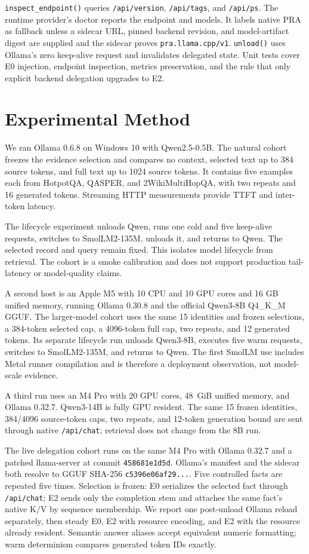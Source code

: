\documentclass[10pt]{article}
\begin{document}
\texttt{inspect\_endpoint()} queries \texttt{/api/version}, \texttt{/api/tags},
and \texttt{/api/ps}. The runtime provider's doctor reports the endpoint and
models. It labels native PRA as fallback unless a sidecar URL, pinned backend
revision, and model-artifact digest are supplied and the sidecar proves
\texttt{pra.llama.cpp/v1}.
\texttt{unload()} uses Ollama's zero keep-alive request and invalidates delegated
state. Unit tests cover E0 injection, endpoint inspection, metrics preservation,
and the rule that only explicit backend delegation upgrades to E2.

\section{Experimental Method}
We ran Ollama 0.6.8 on Windows 10 with Qwen2.5-0.5B. The natural cohort freezes
the evidence selection and compares no context, selected text up to 384 source
tokens, and full text up to 1024 source tokens. It contains five examples each
from HotpotQA, QASPER, and 2WikiMultiHopQA, with two repeats and 16 generated
tokens. Streaming HTTP measurements provide TTFT and inter-token latency.

The lifecycle experiment unloads Qwen, runs one cold and five keep-alive
requests, switches to SmolLM2-135M, unloads it, and returns to Qwen. The selected
record and query remain fixed. This isolates model lifecycle from retrieval.
The cohort is a smoke calibration and does not support production tail-latency
or model-quality claims.

A second host is an Apple M5 with 10 CPU and 10 GPU cores and 16 GB unified
memory, running Ollama 0.30.8 and the official Qwen3-8B Q4\_K\_M GGUF. The
larger-model cohort uses the same 15 identities and frozen selections, a
384-token selected cap, a 4096-token full cap, two repeats, and 12 generated
tokens. Its separate lifecycle run unloads Qwen3-8B, executes five warm
requests, switches to SmolLM2-135M, and returns to Qwen. The first SmolLM use
includes Metal runner compilation and is therefore a deployment observation,
not model-scale evidence.

A third run uses an M4 Pro with 20 GPU cores, 48~GiB unified memory, and Ollama
0.32.7. Qwen3-14B is fully GPU resident. The same 15 frozen identities,
384/4096 source-token caps, two repeats, and 12-token generation bound are sent
through native \texttt{/api/chat}; retrieval does not change from the 8B run.

The live delegation cohort runs on the same M4 Pro with Ollama 0.32.7 and a
patched llama-server at commit \texttt{458681e1d5d}. Ollama's manifest and the
sidecar both resolve to GGUF SHA-256 \texttt{c5396e06af29...}. Five controlled
facts are repeated five times. Selection is frozen: E0 serializes the selected
fact through \texttt{/api/chat}; E2 sends only the completion stem and attaches
the same fact's native K/V by sequence membership. We report one post-unload
Ollama reload separately, then steady E0, E2 with resource encoding, and E2 with
the resource already resident. Semantic answer aliases accept equivalent
numeric formatting; warm determinism compares generated token IDs exactly.
\end{document}
